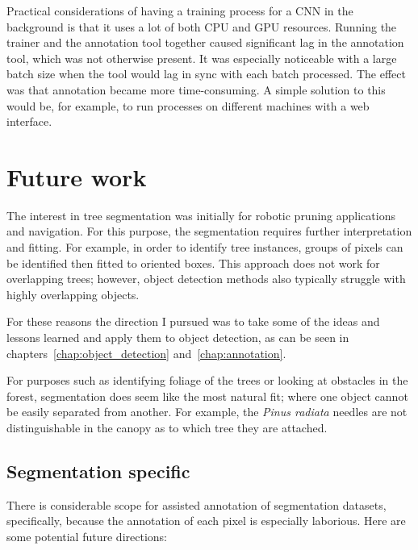 Practical considerations of having a training process for a \gls{CNN} in the background is that it uses a lot of both \gls{CPU} and \gls{GPU} resources. Running the trainer and the annotation tool together caused significant lag in the annotation tool, which was not otherwise present. It was especially noticeable with a large batch size when the tool would lag in sync with each batch processed. The effect was that annotation became more time-consuming. A simple solution to this would be, for example, to run processes on different machines with a web interface.


\section{Future work}

The interest in tree segmentation was initially for robotic pruning applications and navigation. For this purpose, the segmentation requires further interpretation and fitting. For example, in order to identify tree instances, groups of pixels can be identified then fitted to oriented boxes. This approach does not work for overlapping trees; however, object detection methods also typically struggle with highly overlapping objects.

For these reasons the direction I pursued was to take some of the ideas and lessons learned and apply them to object detection, as can be seen in chapters~\ref {chap:object_detection} and~\ref {chap:annotation}.

For purposes such as identifying foliage of the trees or looking at obstacles in the forest, segmentation does seem like the most natural fit; where one object cannot be easily separated from another. For example, the \emph{Pinus radiata} needles are not distinguishable in the canopy as to which tree they are attached.

\subsection{Segmentation specific}

There is considerable scope for assisted annotation of segmentation datasets, specifically, because the annotation of each pixel is especially laborious. Here are some potential future directions: 

